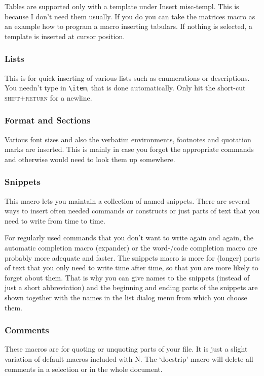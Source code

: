 \documentclass{article}
\newcommand{\nedit}{N\kern-0.8pt{Edit}}
\newcommand{\keyname}[1]{\textsc{#1}}
\begin{document}
Tables are supported only with a template under Insert misc-templ.
This is because I don't need them usually. If you do you can take the matrices macro as an example how to program a macro inserting tabulars.
If nothing is selected, a template is inserted at cursor position. 



\subsubsection{Lists}
This is for quick inserting of various lists such as enumerations or descriptions. You needn't type in \verb|\item|, that is done automatically. Only hit the short-cut \keyname{shift+return} for a newline.

\subsubsection{Format and Sections}
Various font sizes and also the verbatim environments, footnotes and quotation marks are inserted. This is mainly in case you forgot the appropriate commands and otherwise would need to look them up somewhere.

\subsubsection{Snippets}
This macro lets you maintain a collection of named snippets. There are several ways to insert often needed commands or constructs or just parts of text that you need to write from time to time. 

For regularly used commands that you don't want to write again and again, the automatic completion macro (expander) or the word-/code completion macro are probably more adequate and faster. The snippets macro is more for (longer) parts of text that you only need to write time after time, so that you are more likely to forget about them. That is why you can give names to the snippets (instead of just a short abbreviation) and the beginning and ending parts of the snippets are shown together with the names in the list dialog menu from which you choose them.
\subsubsection{Comments}
These macros are for quoting or unquoting parts of your file. It is just a slight variation of default macros included with \nedit. The `docstrip' macro will delete all comments in a selection or in the whole document.
\end{document}
